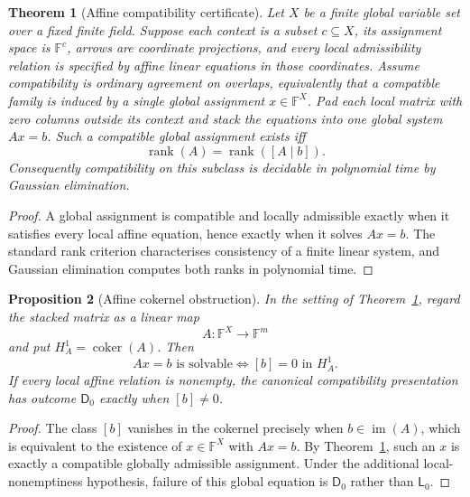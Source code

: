 \documentclass[11pt]{article}
\theoremstyle{plain}
\newtheorem{theorem}{Theorem}[section]
\newtheorem{proposition}[theorem]{Proposition}
\theoremstyle{definition}
\theoremstyle{remark}
\begin{document}
\begin{theorem}[Affine compatibility certificate]\label{thm:affine-certificate}
Let $X$ be a finite global variable set over a fixed finite field. Suppose each
context is a subset $c\subseteq X$, its assignment space is $\mathbb F^c$,
arrows are coordinate projections, and every local admissibility relation is
specified by affine linear equations in those coordinates. Assume compatibility is ordinary agreement on overlaps, equivalently that a
compatible family is induced by a single global assignment $x\in\mathbb F^X$.
Pad each local matrix with zero columns outside its context and stack the
equations into one global system $Ax=b$. Such a compatible global assignment
exists iff
\[
\operatorname{rank}(A)=\operatorname{rank}([A\mid b]).
\]
Consequently compatibility on this subclass is decidable in polynomial time by
Gaussian elimination.
\end{theorem}

\begin{proof}
A global assignment is compatible and locally admissible exactly when it
satisfies every local affine equation, hence exactly when it solves $Ax=b$.
The standard rank criterion characterises consistency of a finite linear system,
and Gaussian elimination computes both ranks in polynomial time.
\end{proof}


\begin{proposition}[Affine cokernel obstruction]\label{prop:affine-cokernel}
In the setting of Theorem~\ref{thm:affine-certificate}, regard the stacked
matrix as a linear map
\[
A:\mathbb F^X\longrightarrow\mathbb F^m
\]
and put $H_A^1=\operatorname{coker}(A)$. Then
\[
Ax=b\text{ is solvable}
\iff [b]=0\text{ in }H_A^1.
\]
If every local affine relation is nonempty, the canonical compatibility
presentation has outcome $\mathsf D_0$ exactly when $[b]\ne0$.
\end{proposition}

\begin{proof}
The class $[b]$ vanishes in the cokernel precisely when
$b\in\operatorname{im}(A)$, which is equivalent to the existence of
$x\in\mathbb F^X$ with $Ax=b$. By Theorem~\ref{thm:affine-certificate}, such an
$x$ is exactly a compatible globally admissible assignment. Under the additional
local-nonemptiness hypothesis, failure of this global equation is
$\mathsf D_0$ rather than $\mathsf L_0$.
\end{proof}
\end{document}
